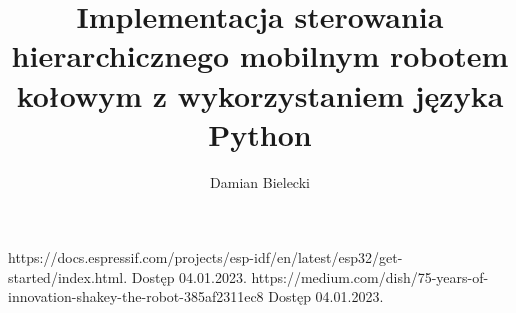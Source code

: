 \documentclass[12pt,twoside]{article}
\author{Damian Bielecki}
\title{Implementacja sterowania hierarchicznego mobilnym robotem kołowym z wykorzystaniem języka Python}
\begin{document}
\maketitle

\blankpage

\tableofcontents
\clearpage
\blankpage










	


\clearpage
	
	
\begin{thebibliography}{4}
	 https://docs.espressif.com/projects/esp-idf/en/latest/esp32/get-started/index.html. Dostęp 04.01.2023.
	 https://medium.com/dish/75-years-of-innovation-shakey-the-robot-385af2311ec8 Dostęp 04.01.2023.

\end{thebibliography}
	
\clearpage
	
\makesummary
\end{document}
